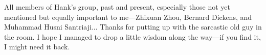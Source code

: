 All members of Hank's group, past and present, especially those not yet mentioned but equally important to me---Zhixuan Zhou, Bernard Dickens, and Muhammad Husni Santriaji...
Thanks for putting up with the sarcastic old guy in the room.
I hope I managed to drop a little wisdom along the way---if you find it, I might need it back.
